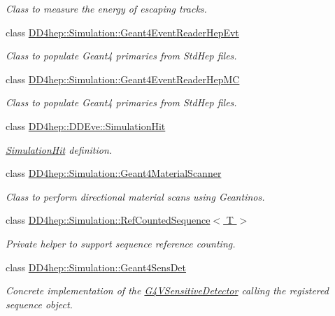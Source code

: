 \begin{DoxyCompactItemize}
\begin{DoxyCompactList}\small\item\em Class to measure the energy of escaping tracks. \end{DoxyCompactList}\item 
class \hyperlink{class_d_d4hep_1_1_simulation_1_1_geant4_event_reader_hep_evt}{D\+D4hep\+::\+Simulation\+::\+Geant4\+Event\+Reader\+Hep\+Evt}
\begin{DoxyCompactList}\small\item\em Class to populate Geant4 primaries from Std\+Hep files. \end{DoxyCompactList}\item 
class \hyperlink{class_d_d4hep_1_1_simulation_1_1_geant4_event_reader_hep_m_c}{D\+D4hep\+::\+Simulation\+::\+Geant4\+Event\+Reader\+Hep\+MC}
\begin{DoxyCompactList}\small\item\em Class to populate Geant4 primaries from Std\+Hep files. \end{DoxyCompactList}\item 
class \hyperlink{class_d_d4hep_1_1_d_d_eve_1_1_simulation_hit}{D\+D4hep\+::\+D\+D\+Eve\+::\+Simulation\+Hit}
\begin{DoxyCompactList}\small\item\em \hyperlink{class_d_d4hep_1_1_d_d_eve_1_1_simulation_hit}{Simulation\+Hit} definition. \end{DoxyCompactList}\item 
class \hyperlink{class_d_d4hep_1_1_simulation_1_1_geant4_material_scanner}{D\+D4hep\+::\+Simulation\+::\+Geant4\+Material\+Scanner}
\begin{DoxyCompactList}\small\item\em Class to perform directional material scans using Geantinos. \end{DoxyCompactList}\item 
class \hyperlink{class_d_d4hep_1_1_simulation_1_1_ref_counted_sequence}{D\+D4hep\+::\+Simulation\+::\+Ref\+Counted\+Sequence$<$ T $>$}
\begin{DoxyCompactList}\small\item\em Private helper to support sequence reference counting. \end{DoxyCompactList}\item 
class \hyperlink{class_d_d4hep_1_1_simulation_1_1_geant4_sens_det}{D\+D4hep\+::\+Simulation\+::\+Geant4\+Sens\+Det}
\begin{DoxyCompactList}\small\item\em Concrete implementation of the \hyperlink{class_g4_v_sensitive_detector}{G4\+V\+Sensitive\+Detector} calling the registered sequence object. \end{DoxyCompactList}\item 

\end{DoxyCompactItemize}
